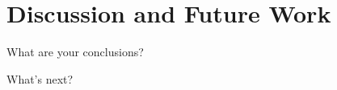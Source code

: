 \fi



\chapter{Discussion and Future Work}
\label{chap:discussion-future-work}

What are your conclusions?

What's next?
